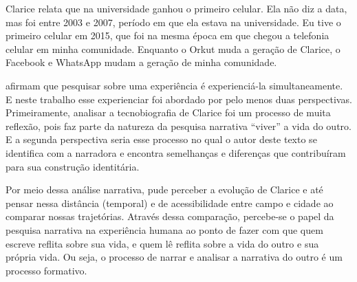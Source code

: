 \documentclass{textolivre-html}
\begin{document}
Clarice relata que na universidade ganhou o primeiro celular. Ela não diz a data, mas foi entre 2003 e 2007, período em que ela estava na universidade. Eu tive o primeiro celular em 2015, que foi na mesma época em que chegou a telefonia celular em minha comunidade. Enquanto o Orkut muda a geração de Clarice, o Facebook e WhatsApp mudam a geração de minha comunidade.

\textcite{clandinin2011} afirmam que pesquisar sobre uma experiência é experienciá-la simultaneamente. E neste trabalho esse experienciar foi abordado por pelo menos duas perspectivas. Primeiramente, analisar a tecnobiografia de Clarice foi um processo de muita reflexão, pois faz parte da natureza da pesquisa narrativa “viver” a vida do outro. E a segunda perspectiva seria esse processo no qual o autor deste texto se identifica com a narradora e encontra semelhanças e diferenças que contribuíram para sua construção identitária. 

Por meio dessa análise narrativa, pude perceber a evolução de Clarice e até pensar nessa distância (temporal) e de acessibilidade entre campo e cidade ao comparar nossas trajetórias. Através dessa comparação, percebe-se o papel da pesquisa narrativa na experiência humana ao ponto de fazer com que quem escreve reflita sobre sua vida, e quem lê reflita sobre a vida do outro e sua própria vida. Ou seja, o processo de narrar e analisar a narrativa do outro é um processo formativo.

\printbibliography\label{sec-bib}
\end{document}
